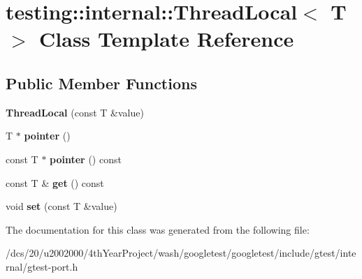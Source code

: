 \hypertarget{classtesting_1_1internal_1_1ThreadLocal}{}\section{testing\+:\+:internal\+:\+:Thread\+Local$<$ T $>$ Class Template Reference}
\label{classtesting_1_1internal_1_1ThreadLocal}
\subsection*{Public Member Functions}
\begin{DoxyCompactItemize}
\item 
\mbox{\label{classtesting_1_1internal_1_1ThreadLocal_a85610bdfdbc93a4c56215e0aad7da870}} 
{\bfseries Thread\+Local} (const T \&value)
\item 
\mbox{\label{classtesting_1_1internal_1_1ThreadLocal_a882f57fed4b074de83693c0c0fe62858}} 
T $\ast$ {\bfseries pointer} ()
\item 
\mbox{\label{classtesting_1_1internal_1_1ThreadLocal_a57e45bb60e3cd94abb04fa449e9f0367}} 
const T $\ast$ {\bfseries pointer} () const
\item 
\mbox{\label{classtesting_1_1internal_1_1ThreadLocal_ac56aeb97991824979bf192c63d1466f8}} 
const T \& {\bfseries get} () const
\item 
\mbox{\label{classtesting_1_1internal_1_1ThreadLocal_ab5ebc7ba07426cef7167afa2a7707eb4}} 
void {\bfseries set} (const T \&value)
\end{DoxyCompactItemize}


The documentation for this class was generated from the following file\+:\begin{DoxyCompactItemize}
\item 
/dcs/20/u2002000/4th\+Year\+Project/wash/googletest/googletest/include/gtest/internal/gtest-\/port.\+h\end{DoxyCompactItemize}
